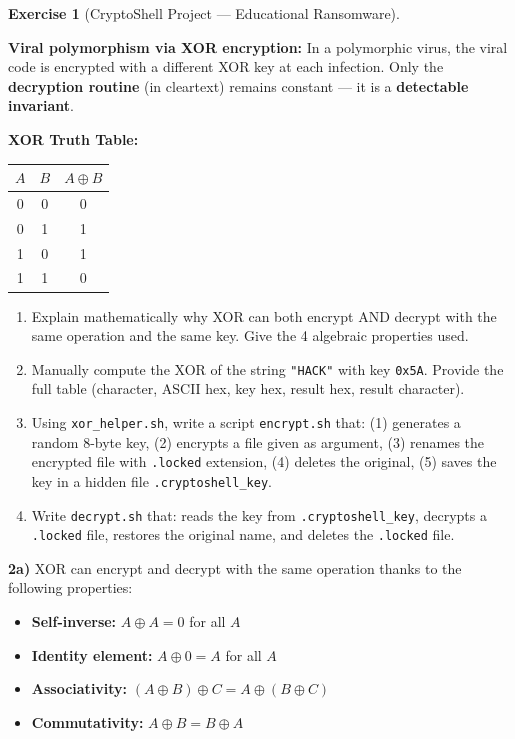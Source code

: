 \documentclass[a4paper,11pt]{article}
\theoremstyle{plain}
\theoremstyle{definition}
\newtheorem{exercice}{Exercise}
\begin{document}
\begin{exercice}[CryptoShell Project --- Educational Ransomware]
\begin{rappel}
\medskip
\textbf{Viral polymorphism via XOR encryption:} In a polymorphic virus, the viral code is encrypted with a different XOR key at each infection. Only the \textbf{decryption routine} (in cleartext) remains constant --- it is a \textbf{detectable invariant}.

\medskip
\textbf{XOR Truth Table:}
\begin{center}
\begin{tabular}{cc|c}
$A$ & $B$ & $A \oplus B$ \\
\midrule
0 & 0 & 0 \\
0 & 1 & 1 \\
1 & 0 & 1 \\
1 & 1 & 0 \\
\end{tabular}
\end{center}
\end{rappel}

\begin{enumerate}
\item[\textbf{2a)}] Explain mathematically why XOR can both encrypt AND decrypt with the same operation and the same key. Give the 4 algebraic properties used.

\item[\textbf{2b)}] Manually compute the XOR of the string \texttt{"HACK"} with key \texttt{0x5A}. Provide the full table (character, ASCII hex, key hex, result hex, result character).

\item[\textbf{2c)}] Using \texttt{xor\_helper.sh}, write a script \texttt{encrypt.sh} that: (1) generates a random 8-byte key, (2) encrypts a file given as argument, (3) renames the encrypted file with \texttt{.locked} extension, (4) deletes the original, (5) saves the key in a hidden file \texttt{.cryptoshell\_key}.

\item[\textbf{2d)}] Write \texttt{decrypt.sh} that: reads the key from \texttt{.cryptoshell\_key}, decrypts a \texttt{.locked} file, restores the original name, and deletes the \texttt{.locked} file.
\end{enumerate}

\begin{correction}

\textbf{2a)} XOR can encrypt and decrypt with the same operation thanks to the following properties:
\begin{itemize}
    \item \textbf{Self-inverse:} $A \oplus A = 0$ for all $A$
    \item \textbf{Identity element:} $A \oplus 0 = A$ for all $A$
    \item \textbf{Associativity:} $(A \oplus B) \oplus C = A \oplus (B \oplus C)$
    \item \textbf{Commutativity:} $A \oplus B = B \oplus A$
\end{itemize}


\end{correction}
\end{exercice}
\end{document}
